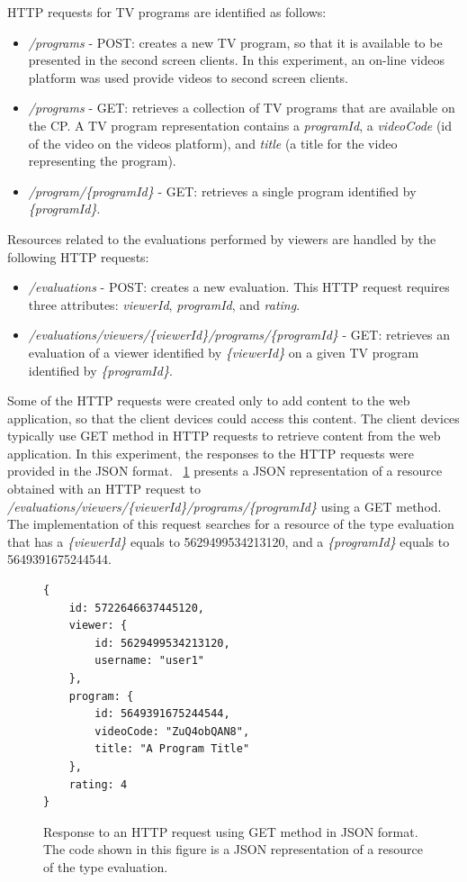 \documentclass[journal]{IEEEtran}
\begin{document}
HTTP requests for TV programs are identified as follows:

\begin{itemize}
	\item \emph{/programs} - POST: creates a new TV program, so that it is available to be presented in the second screen clients. In this experiment, an on-line videos platform was used provide videos to second screen clients. 
	\item \emph{/programs} - GET: retrieves a collection of TV programs that are available on the CP. A TV program representation contains a \emph{programId}, a \emph{videoCode} (id of the video on the videos platform), and \emph{title} (a title for the video representing the program).
	\item \emph{/program/\{programId\}} - GET: retrieves a single program identified by \emph{\{programId\}}.
\end{itemize}

Resources related to the evaluations performed by viewers are handled by the following HTTP requests:

\begin{itemize}
	\item \emph{/evaluations} - POST: creates a new evaluation. This HTTP request requires three attributes: \emph{viewerId}, \emph{programId}, and \emph{rating}.
	\item \emph{/evaluations/viewers/\{viewerId\}/programs/\{programId\}} - GET: retrieves an evaluation of a viewer identified by \emph{\{viewerId\}} on a given TV program identified by \emph{\{programId\}}.
\end{itemize}

Some of the HTTP requests were created only to add content to the web application, so that the client devices could access this content. The client devices typically use GET method in HTTP requests to retrieve content from the web application. In this experiment, the responses to the HTTP requests were provided in the JSON format. \figurename{~\ref{fig_response_json}} presents a JSON representation of a resource obtained with an HTTP request to \emph{/evaluations/viewers/\{viewerId\}/programs/\{programId\}} using a GET method. The implementation of this request searches for a resource of the type evaluation that has a \emph{\{viewerId\}} equals to 5629499534213120, and a \emph{\{programId\}} equals to 5649391675244544.

\begin{figure}
\begin{verbatim}
{
    id: 5722646637445120,
    viewer: {
        id: 5629499534213120,
        username: "user1"
    },
    program: {
        id: 5649391675244544,
        videoCode: "ZuQ4obQAN8",
        title: "A Program Title"
    },
    rating: 4
}
\end{verbatim}
\caption{Response to an HTTP request using GET method in JSON format. The code shown in this figure is a JSON representation of a resource of the type evaluation.}
\label{fig_response_json}
\end{figure}
\end{document}
